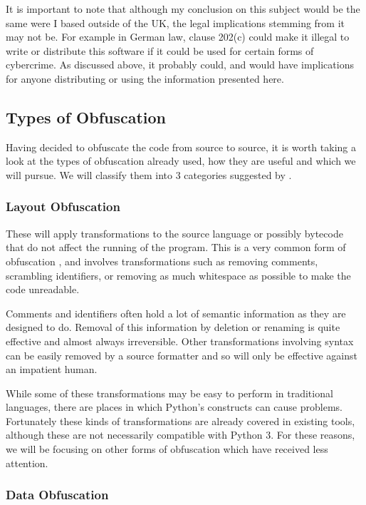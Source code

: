 \documentclass{report}
\begin{document}
It is important to note that although my conclusion on this subject would be the same were I based outside of
the UK, the legal implications stemming from it may not be. For example in German law, clause 202(c) \cite{202c}
could make it illegal to write or distribute this software if it could be used for
certain forms of cybercrime. As discussed above, it probably could, and would have implications for anyone distributing
or using the information presented here.

\subsection{Types of Obfuscation}

Having decided to obfuscate the code from source to source, it is worth taking a look at the types of
obfuscation already used, how they are useful and which we will pursue. We will classify them into 3 categories
suggested by \cite[p10]{desevobf}.

\subsubsection{Layout Obfuscation}

These will apply transformations to the source language or possibly bytecode that do not affect the running of the
program. This is a very common form of obfuscation \cite[p10]{desevobf}, and involves transformations such as removing comments,
scrambling identifiers, or removing as much whitespace as possible to make the code unreadable.

Comments and identifiers often hold a lot of semantic information as they are designed to do.
Removal of this information by deletion or renaming is quite effective and almost always irreversible. Other transformations involving syntax
can be easily removed by a source formatter and so will only be effective against an impatient human.

While some of these transformations may be easy to perform in traditional languages, there are places in which
Python's constructs can cause problems. Fortunately these kinds of transformations are already covered in existing
tools, although these are not necessarily compatible with Python 3. For these reasons, we will be focusing on other forms of
obfuscation which have received less attention.

\subsubsection{Data Obfuscation}
\end{document}
